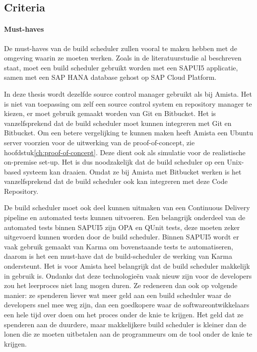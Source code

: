         \subsection{Criteria}
        \label{subsec:criteria}
        

            \paragraph{Must-haves}
            De must-haves van de build scheduler zullen vooral te maken hebben met de omgeving waarin ze moeten werken. Zoals in de literatuurstudie al beschreven staat, moet een build scheduler gebruikt worden met een SAPUI5 applicatie, samen met een SAP HANA database gehost op SAP Cloud Platform.
            
            In deze thesis wordt dezelfde source control manager gebruikt als bij Amista. Het is niet van toepassing om zelf een source control system en repository manager te kiezen, er moet gebruik gemaakt worden van Git en Bitbucket. Het is vanzelfsprekend dat de build scheduler moet kunnen integreren met Git en Bitbucket.
            Om een betere vergelijking te kunnen maken heeft Amista een Ubuntu server voorzien voor de uitwerking van de proof-of-concept, zie hoofdstuk\ref{ch:proof-of-concept}. Deze dient ook als simulatie voor de realistische on-premise set-up. Het is dus noodzakelijk dat de build scheduler op een Unix-based systeem kan draaien.
            Omdat ze bij Amista met Bitbucket werken is het vanzelfsprekend dat de build scheduler ook kan integreren met deze Code Repository.
            
            De build scheduler moet ook deel kunnen uitmaken van een Continuous Delivery pipeline en automated tests kunnen uitvoeren. Een belangrijk onderdeel van de automated tests binnen SAPUI5 zijn OPA en QUnit  tests, deze moeten zeker uitgevoerd kunnen worden door de build scheduler.
            Binnen SAPUI5 wordt er vaak gebruik gemaakt van Karma om bovenstaande tests te automatiseren, daarom is het een must-have dat de build-scheduler de werking van Karma ondersteunt.
            Het is voor Amista heel belangrijk dat de build scheduler makkelijk in gebruik is. Ondanks dat deze technologieën vaak nieuw zijn voor de developers zou het leerproces niet lang mogen duren. Ze redeneren dan ook op volgende manier: ze spenderen liever wat meer geld aan een build scheduler waar de developers snel mee weg zijn, dan een goedkopere waar de softwareontwikkelaars een hele tijd over doen om het proces onder de knie te krijgen. Het geld dat ze spenderen aan de duurdere, maar makkelijkere build scheduler is kleiner dan de lonen die ze moeten uitbetalen aan de programmeurs om de tool onder de knie te krijgen.
            
